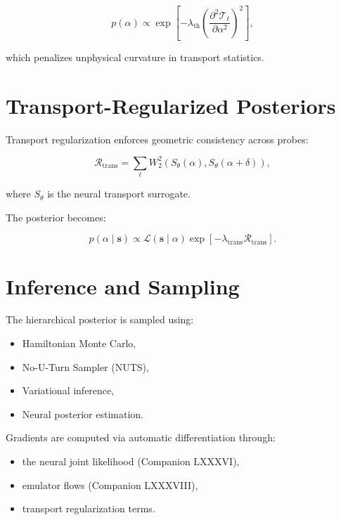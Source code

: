 \documentclass[11pt,a4paper]{article}
\begin{document}
\[
    p(\alpha)
    \propto
    \exp\!\left[
        -\lambda_{\mathrm{th}}
        \left(
            \frac{\partial^{2} \mathcal{T}_{\ell}}{\partial \alpha^{2}}
        \right)^{2}
    \right],
\]



which penalizes unphysical curvature in transport statistics.
\section{Transport-Regularized Posteriors}

Transport regularization enforces geometric consistency across probes:



\[
    \mathcal{R}_{\mathrm{trans}}
    =
    \sum_{\ell}
    W_{2}^{2}
    \left(
        S_{\theta}(\alpha),
        S_{\theta}(\alpha + \delta)
    \right),
\]



where $S_{\theta}$ is the neural transport surrogate.

The posterior becomes:



\[
    p(\alpha \mid \mathbf{s})
    \propto
    \mathcal{L}(\mathbf{s} \mid \alpha)
    \exp\!\left[
        -\lambda_{\mathrm{trans}}
        \mathcal{R}_{\mathrm{trans}}
    \right].
\]


\section{Inference and Sampling}

The hierarchical posterior is sampled using:

\begin{itemize}
    \item Hamiltonian Monte Carlo,
    \item No-U-Turn Sampler (NUTS),
    \item Variational inference,
    \item Neural posterior estimation.
\end{itemize}

Gradients are computed via automatic differentiation through:

\begin{itemize}
    \item the neural joint likelihood (Companion LXXXVI),
    \item emulator flows (Companion LXXXVIII),
    \item transport regularization terms.
\end{itemize}
\end{document}
